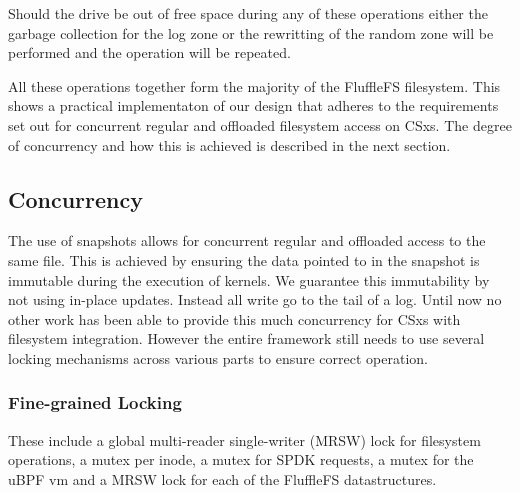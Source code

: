Should the drive be out of free space during any of these operations either the
garbage collection for the log zone or the rewritting of the random zone will
be performed and the operation will be repeated.

All these operations together form the majority of the FluffleFS filesystem.
This shows a practical implementaton of our design that adheres to the
requirements set out for concurrent regular and offloaded filesystem access on
CSxs. The degree of concurrency and how this is achieved is described in the
next section.



\subsection{Concurrency}

The use of snapshots allows for concurrent regular and offloaded access to the
same file. This is achieved by ensuring the data pointed to in the snapshot
is immutable during the execution of kernels. We guarantee this immutability by
not using in-place updates. Instead all write go to the tail of a log. Until now
no other work has been able to provide this much concurrency for CSxs with
filesystem integration. However the entire framework still needs to use several
locking mechanisms across various parts to ensure correct operation.

\subsubsection{Fine-grained Locking}

These include a global multi-reader single-writer (MRSW) lock for filesystem
operations, a mutex per inode, a mutex for SPDK requests, a mutex for the uBPF
vm and a MRSW lock for each of the FluffleFS datastructures.

